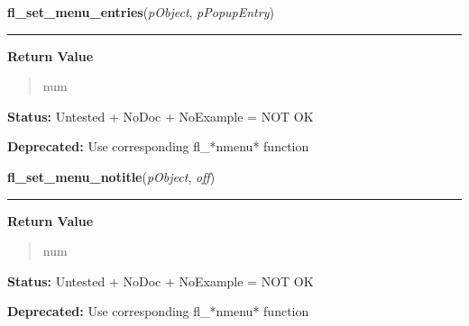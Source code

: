     \label{xformslib:library:fl_set_menu_entries}

    \vspace{0.5ex}

\hspace{.8\funcindent}\begin{boxedminipage}{\funcwidth}

    \raggedright \textbf{fl\_set\_menu\_entries}(\textit{pObject}, \textit{pPopupEntry})

    \vspace{-1.5ex}

    \rule{\textwidth}{0.5\fboxrule}
\setlength{\parskip}{2ex}
\setlength{\parskip}{1ex}
      \textbf{Return Value}
    \vspace{-1ex}

      \begin{quote}
      num

      \end{quote}

\textbf{Status:} Untested + NoDoc + NoExample = NOT OK



\textbf{Deprecated:} Use corresponding fl\_*nmenu* function



    \end{boxedminipage}

    \label{xformslib:library:fl_set_menu_notitle}

    \vspace{0.5ex}

\hspace{.8\funcindent}\begin{boxedminipage}{\funcwidth}

    \raggedright \textbf{fl\_set\_menu\_notitle}(\textit{pObject}, \textit{off})

    \vspace{-1.5ex}

    \rule{\textwidth}{0.5\fboxrule}
\setlength{\parskip}{2ex}
\setlength{\parskip}{1ex}
      \textbf{Return Value}
    \vspace{-1ex}

      \begin{quote}
      num

      \end{quote}

\textbf{Status:} Untested + NoDoc + NoExample = NOT OK



\textbf{Deprecated:} Use corresponding fl\_*nmenu* function



    \end{boxedminipage}

